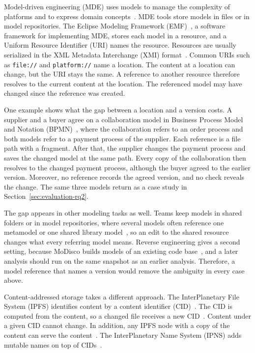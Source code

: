 \documentclass[iicol,pdflatex,sn-mathphys-num]{sn-jnl}
\theoremstyle{thmstylethree}%
\begin{document}
Model-driven engineering (MDE) uses models to manage the complexity of platforms and to express domain concepts~\cite{schmidt2006mde}. MDE tools store models in files or in model repositories. The Eclipse Modeling Framework (EMF)~\cite{steinberg2008emf}, a software framework for implementing MDE, stores each model in a resource, and a Uniform Resource Identifier (URI) names the resource. Resources are usually serialized in the XML Metadata Interchange (XMI) format~\cite{omg2015xmi}. Common URIs such as \texttt{file://} and \texttt{platform://} name a location. The content at a location can change, but the URI stays the same. A reference to another resource therefore resolves to the current content at the location. The referenced model may have changed since the reference was created.

One example shows what the gap between a location and a version costs. A supplier and a buyer agree on a collaboration model in Business Process Model and Notation (BPMN)~\cite{omg2010bpmn}, where the collaboration refers to an order process and both models refer to a payment process of the supplier. Each reference is a file path with a fragment. After that, the supplier changes the payment process and saves the changed model at the same path. Every copy of the collaboration then resolves to the changed payment process, although the buyer agreed to the earlier version. Moreover, no reference records the agreed version, and no check reveals the change. The same three models return as a case study in Section~\ref{sec:evaluation-rq2}.

The gap appears in other modeling tasks as well. Teams keep models in shared folders or in model repositories, where several models often reference one metamodel or one shared library model~\cite{dirocco2015repositories,franzago2018collaborative}, so an edit to the shared resource changes what every referring model means. Reverse engineering gives a second setting, because MoDisco builds models of an existing code base~\cite{bruneliere2010modisco,bruneliere2014modisco}, and a later analysis should run on the same snapshot as an earlier analysis. Therefore, a model reference that names a version would remove the ambiguity in every case above.

Content-addressed storage takes a different approach. The InterPlanetary File System (IPFS) identifies content by a content identifier (CID)~\cite{benet2014ipfs,ipfsdocscid}. The CID is computed from the content, so a changed file receives a new CID~\cite{ipfsdocsipns}. Content under a given CID cannot change. In addition, any IPFS node with a copy of the content can serve the content~\cite{trautwein2022ipfs}. The InterPlanetary Name System (IPNS) adds mutable names on top of CIDs~\cite{ipfsdocsipns}.
\end{document}
